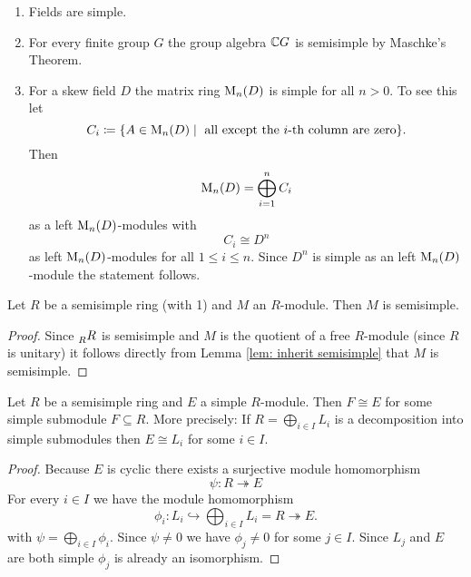 \begin{expls}
  \begin{enumerate}[label=\emph{\alph*)},leftmargin=*]
    \item
      Fields are simple.
    \item
      For every finite group $G$ the group algebra $\mathbb{C} G$ is semisimple by Maschke’s Theorem.
    \item
      For a skew field $D$ the matrix ring $\operatorname{M}_n(D)$ is simple for all $n > 0$.
      To see this let
      \[
        C_i
        \coloneqq \{
                    A \in \operatorname{M}_n(D)
                  \mid
                    \text{ all except the $i$-th column are zero}
                  \}.
      \]
      Then
      \[
          \operatorname{M}_n(D)
        = \bigoplus_{i=1}^n C_i
      \]
      as a left $\operatorname{M}_n(D)$-modules with
      \[
        C_i \cong D^n
      \]
      as left $\operatorname{M}_n(D)$-modules for all $1 \leq i \leq n$.
      Since $D^n$ is simple as an left $\operatorname{M}_n(D)$-module the statement follows.
  \end{enumerate}
\end{expls}


\begin{prop}
  Let $R$ be a semisimple ring (with 1) and $M$ an $R$-module.
  Then $M$ is semisimple.
\end{prop}
\begin{proof}
  Since $\prescript{}{R}{R}$ is semisimple and $M$ is the quotient of a free $R$-module (since $R$ is unitary) it follows directly from Lemma \ref{lem: inherit semisimple} that $M$ is semisimple.
\end{proof}


\begin{lem}\label{lem: simple module of semisimple ring is direct summand}
  Let $R$ be a semisimple ring and $E$ a simple $R$-module.
  Then $F \cong E$ for some simple submodule $F \subseteq R$.
  More precisely:
  If $R = \bigoplus_{i \in I} L_i$ is a decomposition into simple submodules then $E \cong L_i$ for some $i \in I$.
\end{lem}
\begin{proof}
  Because $E$ is cyclic there exists a surjective module homomorphism
  \[
                        \psi
    \colon              R
    \twoheadrightarrow  E
  \]
  For every $i \in I$ we have the module homomorphism
  \[
                        \phi_i
    \colon              L_i
    \hookrightarrow     \bigoplus_{i \in I} L_i
    =                   R
    \twoheadrightarrow  E.
  \]
  with $\psi = \bigoplus_{i \in I} \phi_i$.
  Since $\psi \neq 0$ we have $\phi_j \neq 0$ for some $j \in I$.
  Since $L_j$ and $E$ are both simple $\phi_j$ is already an isomorphism.
\end{proof}


